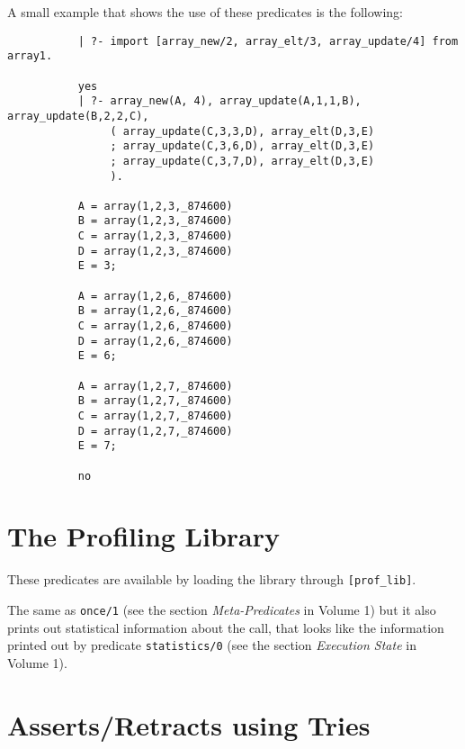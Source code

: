 A small example that shows the use of these predicates is the following:
{\footnotesize
 \begin{verbatim}
           | ?- import [array_new/2, array_elt/3, array_update/4] from array1.

           yes
           | ?- array_new(A, 4), array_update(A,1,1,B), array_update(B,2,2,C),
                ( array_update(C,3,3,D), array_elt(D,3,E)
                ; array_update(C,3,6,D), array_elt(D,3,E)
                ; array_update(C,3,7,D), array_elt(D,3,E)
                ).

           A = array(1,2,3,_874600)
           B = array(1,2,3,_874600)
           C = array(1,2,3,_874600)
           D = array(1,2,3,_874600)
           E = 3;

           A = array(1,2,6,_874600)
           B = array(1,2,6,_874600)
           C = array(1,2,6,_874600)
           D = array(1,2,6,_874600)
           E = 6;

           A = array(1,2,7,_874600)
           B = array(1,2,7,_874600)
           C = array(1,2,7,_874600)
           D = array(1,2,7,_874600)
           E = 7;

           no
 \end{verbatim}
}


\section{The Profiling Library}

These predicates are available by loading the library through
{\tt [prof\_lib]}.

\begin{description}
     The same as {\tt once/1} (see the section {\it Meta-Predicates}
in Volume 1)
     but it also prints out statistical information about the call,
     that looks like the information printed out by predicate
     {\tt statistics/0} (see the section {\it Execution State} in Volume 1).
\end{description}

%
\section{Asserts/Retracts using Tries }



